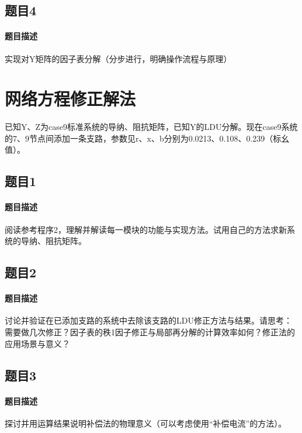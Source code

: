 \documentclass[a4paper,12pt]{article}
\begin{document}
    \subsection{题目4}
    \paragraph{题目描述} 实现对Y矩阵的因子表分解（分步进行，明确操作流程与原理）
    \section{网络方程修正解法}
    已知Y、Z为case9标准系统的导纳、阻抗矩阵，已知Y的LDU分解。现在case9系统的7、9节点间添加一条支路，参数见r、x、b分别为0.0213、0.108、0.239（标幺值）。
    \subsection{题目1}
    \paragraph{题目描述} 阅读参考程序2，理解并解读每一模块的功能与实现方法。试用自己的方法求新系统的导纳、阻抗矩阵。
    \subsection{题目2}
    \paragraph{题目描述} 讨论并验证在已添加支路的系统中去除该支路的LDU修正方法与结果。请思考：需要做几次修正？因子表的秩1因子修正与局部再分解的计算效率如何？修正法的应用场景与意义？
    \subsection{题目3}
    \paragraph{题目描述} 探讨并用运算结果说明补偿法的物理意义（可以考虑使用“补偿电流”的方法）。

    \newpage
    
    
    \appendix
\end{document}
